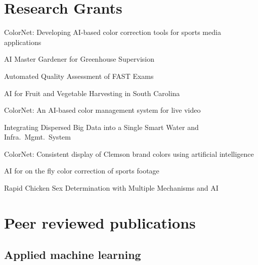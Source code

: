 \documentclass[11pt,letterpaper,roman]{moderncv}        %
\begin{document}

\section{Research Grants}
\quad ColorNet: Developing AI-based color correction tools for sports media applications

\quad AI Master Gardener for Greenhouse Supervision

\quad Automated Quality Assessment of FAST Exams

\quad AI for Fruit and Vegetable Harvesting in South Carolina

\quad ColorNet: An AI-based color management system for live video

\quad Integrating Dispersed Big Data into a Single Smart Water and Infra.~Mgmt.~System

\quad ColorNet: Consistent display of Clemson brand colors using artificial intelligence

\quad AI for on the fly color correction of sports footage

\quad Rapid Chicken Sex Determination with Multiple Mechanisms and AI


\section{Peer reviewed publications}
\subsection{Applied machine learning}

\begin{refsection}
  \nocite{*}
  \printbibliography[heading=none]
\end{refsection}
\end{document}
